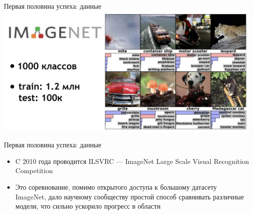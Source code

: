 \documentclass[aspectratio=169]{beamer}
\begin{document}
\begin{frame}{Первая половина успеха: данные}
    \centering
    \includegraphics[width=.97\linewidth]{graphs/fig21.jpg}
\end{frame}

\begin{frame}{Первая половина успеха: данные}
    \begin{itemize}
        \item C 2010 года проводится ILSVRC --- ImageNet Large Scale Visual
        Recognition Competition
        \item Это соревнование, помимо открытого доступа к большому датасету
        ImageNet, дало научному сообществу простой способ сравнивать
        различные модели, что сильно ускорило прогресс в области
    \end{itemize}
\end{frame}
\end{document}
